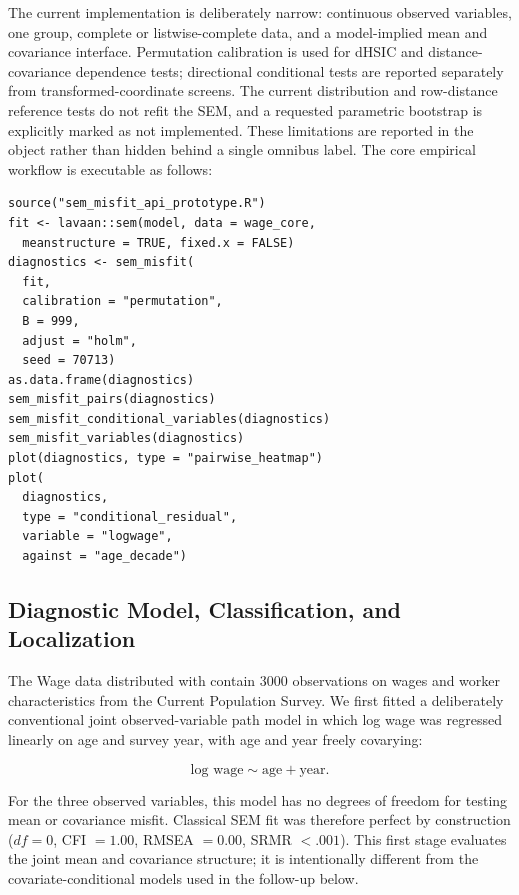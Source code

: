 \documentclass[floatsintext,a4paper]{apa7} %
\begin{document}
	The current implementation is deliberately narrow: continuous observed variables, one group, complete or listwise-complete data, and a model-implied mean and covariance interface. Permutation calibration is used for dHSIC and distance-covariance dependence tests; directional conditional tests are reported separately from transformed-coordinate screens. The current distribution and row-distance reference tests do not refit the SEM, and a requested parametric bootstrap is explicitly marked as not implemented. These limitations are reported in the object rather than hidden behind a single omnibus label. The core empirical workflow is executable as follows:
	
\noindent\begin{minipage}{\columnwidth}
\small
\begin{verbatim}
source("sem_misfit_api_prototype.R")
fit <- lavaan::sem(model, data = wage_core,
  meanstructure = TRUE, fixed.x = FALSE)
diagnostics <- sem_misfit(
  fit,
  calibration = "permutation",
  B = 999,
  adjust = "holm",
  seed = 70713)
as.data.frame(diagnostics)
sem_misfit_pairs(diagnostics)
sem_misfit_conditional_variables(diagnostics)
sem_misfit_variables(diagnostics)
plot(diagnostics, type = "pairwise_heatmap")
plot(
  diagnostics,
  type = "conditional_residual",
  variable = "logwage",
  against = "age_decade")
\end{verbatim}
\end{minipage}
	
	\subsection{Diagnostic Model, Classification, and Localization}
	The Wage data distributed with \citet{james2021introduction} contain 3000 observations on wages and worker characteristics from the Current Population Survey. We first fitted a deliberately conventional joint observed-variable path model in which log wage was regressed linearly on age and survey year, with age and year freely covarying:
	
	$$
	\text{log wage} \sim \text{age} + \text{year}.
	$$
	
	For the three observed variables, this model has no degrees of freedom for testing mean or covariance misfit. Classical SEM fit was therefore perfect by construction ($df = 0$, CFI $= 1.00$, RMSEA $= 0.00$, SRMR $< .001$). This first stage evaluates the joint mean and covariance structure; it is intentionally different from the covariate-conditional models used in the follow-up below.
	
\end{document}
